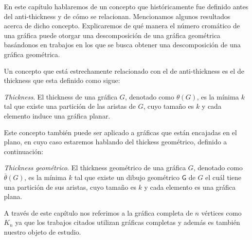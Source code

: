 

En este capítulo hablaremos de un concepto que históricamente fue definido antes
del anti-thickness y de cómo se relacionan. Mencionamos algunos resultados acerca
de dicho concepto. Explicaremos de qué manera el número cromático de una
gráfica puede otorgar una descomposición de una gráfica geométrica basándonos
en trabajos en los que se busca obtener una descomposición de una gráfica geométrica.

Un concepto que está estrechamente relacionado con el de anti-thickness es el
de thickness que esta definido como sigue:
\begin{definition}{\emph{Thickness}.}
  El thickness de una gráfica $G$, denotado como $\theta(G)$, es la mínima $k$ tal que existe
  una partición de las aristas de $G$, cuyo tamaño es $k$ y cada elemento
  induce una gráfica planar.
\end{definition}
Este concepto también puede ser aplicado a gráficas que están encajadas en el plano,
en cuyo caso estaremos hablando del thickess geométrico, definido a continuación:
\begin{definition}{\emph{Thickness geométrico}.}
  El thickness geométrico de una gráfica $G$, denotado como $\bar{\theta}(G)$,
  es la mínima $k$ tal que existe un dibujo geométrico $\mathsf{G}$ de $G$
  el cuál tiene una partición de sus aristas, cuyo tamaño es $k$ y cada
  elemento es una gráfica plana.
\end{definition}

A través de este capítulo nos referimos a la gráfica completa de $n$ vértices
como $K_n$ ya que los trabajos citados utilizan gráficas completas y además
es también nuestro objeto de estudio.

